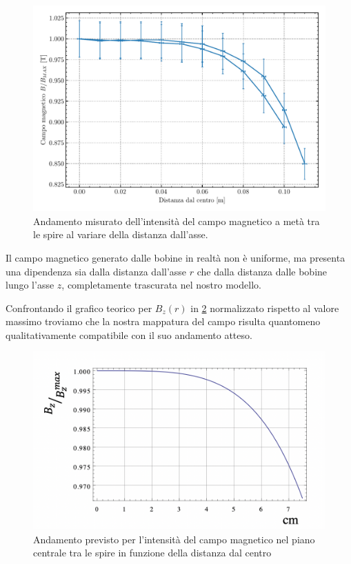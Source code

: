 \documentclass[10pt, a4paper, italian]{article}
\begin{document}
\begin{figure}[htbp]
\includegraphics[width=\textwidth]{Bdist}
\caption{Andamento misurato dell'intensità del campo magnetico a metà tra le
spire al variare della distanza dall'asse. \label{fig: Bpos}}
\end{figure}

Il campo magnetico generato dalle bobine in realtà non è uniforme, ma presenta
una dipendenza sia dalla distanza dall'asse $r$ che dalla distanza dalle
bobine lungo l'asse $z$, completamente trascurata nel nostro modello.

Confrontando il grafico teorico per $B_z(r)$ in \cref{fig: Bref} normalizzato
rispetto al valore massimo troviamo che la nostra mappatura del campo risulta
quantomeno qualitativamente compatibile con il suo andamento atteso.
\begin{figure}[htbp]
\includegraphics[width=\textwidth]{riferimentoB}
\caption{Andamento previsto per l'intensità del campo magnetico nel piano
centrale tra le spire in funzione della distanza dal centro \label{fig: Bref}}
\end{figure}
\end{document}
